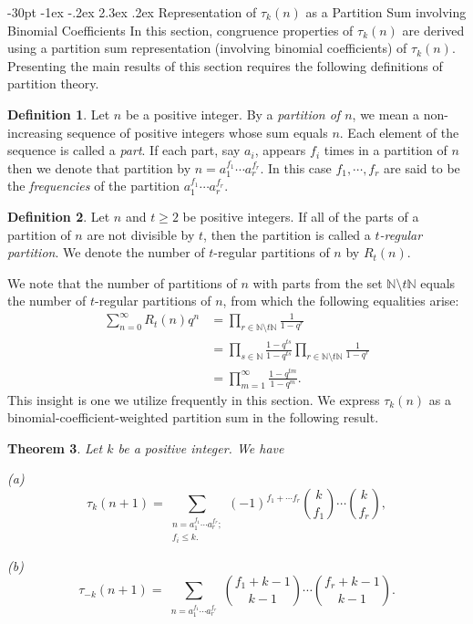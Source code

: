 \documentclass[10pt]{article}
\makeatletter
\renewcommand\section{\@startsection {section}{1}{\z@}
{-30pt \@plus -1ex \@minus -.2ex}
{2.3ex \@plus.2ex}
{\normalfont\normalsize\bfseries\boldmath}}
\newtheorem{theorem}{Theorem}[section]
\theoremstyle{definition}
\newtheorem{definition}[theorem]{Definition}
\makeatother
\begin{document}
\section{ Representation of $\tau_k(n)$ as a Partition Sum involving Binomial Coefficients} 
In this section, congruence properties of $\tau_k(n)$ are derived using a partition sum representation (involving binomial coefficients) of $\tau_k(n)$. Presenting the main results of this section requires the following definitions of partition theory.
\begin{definition}
\normalfont Let $n$ be a positive integer. By a {\it partition of $n$}, we mean a non-increasing sequence of positive integers whose sum equals $n$. Each element of the sequence is called a {\it part}. If each part, say $a_i$, appears $f_i$ times in a partition of $n$ then we denote that partition by $n=a_1^{f_1}\cdots a_r^{f_r}$. In this case $f_1, \cdots ,f_r$ are said to be the {\it frequencies} of the partition $a_1^{f_1}\cdots a_r^{f_r}$.
\end{definition}
\begin{definition}
\normalfont Let $n$ and $t\geq 2$ be positive integers. If all of the parts of a partition of $n$ are not divisible by $t$, then the partition is called a {\it $t$-regular partition}. We denote the number of $t$-regular partitions of $n$ by $R_t(n)$.
\end{definition}
We note that the number of partitions of $n$ with parts from the set $\mathbb{N}\setminus t\mathbb{N}$ equals the number of $t$-regular partitions of $n$, from which the following equalities arise:
\begin{align*}
\sum_{n=0}^{\infty}R_t(n)q^n&=\prod\limits_{r\in\mathbb{N}\setminus t\mathbb{N}}\frac{1}{1-q^r}\\
&=\prod_{s\in \mathbb{N}}\frac{1-q^{ts}}{1-q^{ts}}\prod\limits_{r\in\mathbb{N}\setminus t\mathbb{N}}\frac{1}{1-q^r}\\ 
&=\prod_{m=1}^{\infty}\frac{1-q^{tm}}{1-q^m}.
\end{align*}
This insight is one we utilize frequently in this section.
We express $\tau_k(n)$ as a binomial-coefficient-weighted partition sum in the following result.
\begin{theorem}\label{binomial-representation}
Let $k$ be a positive integer. We have
\begin{description}
\item{(a)}
\begin{equation}\label{positive}
\tau_k(n+1)=\sum_{\substack{n=a_1^{f_1}\cdots a_r^{f_r};\\ f_i\leq k.}}(-1)^{f_1+\cdots f_r}{k\choose{f_1}}\cdots {k\choose{f_r}},
\end{equation}
\item{(b)}
\begin{equation}\label{negative}
\tau_{-k}(n+1)=\sum_{\substack{n=a_1^{f_1}\cdots a_r^{f_r}}}{f_1+k-1\choose{k-1}}\cdots {f_r+k-1\choose{k-1}}. 
\end{equation}
\end{description}
\end{theorem}
\end{document}
